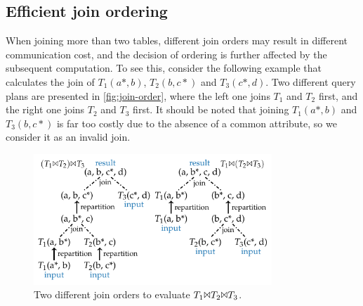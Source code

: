 \documentclass{sokendai_thesis} %
\begin{document}

\subsection{Efficient join ordering}
\label{sec:join-more}

When joining more than two tables, different join orders may result in different communication cost, and the decision of ordering is further affected by the subsequent computation.
To see this, consider the following example that calculates the join of $T_1(a*, b)$, $T_2(b, c*)$ and $T_3(c*, d)$.
Two different query plans are presented in \autoref{fig:join-order}, where the left one joins $T_1$ and $T_2$ first, and the right one joins $T_2$ and $T_3$ first.
It should be noted that joining $T_1(a*, b)$ and $T_3(b, c*)$ is far too costly due to the absence of a common attribute, so we consider it as an invalid join.

\begin{figure}
\centering
\includegraphics[width=0.8\textwidth]{figures/join-order.pdf}
\caption{Two different join orders to evaluate $T_1 \Bowtie T_2 \Bowtie T_3$.}
\label{fig:join-order}
\end{figure}
\end{document}
